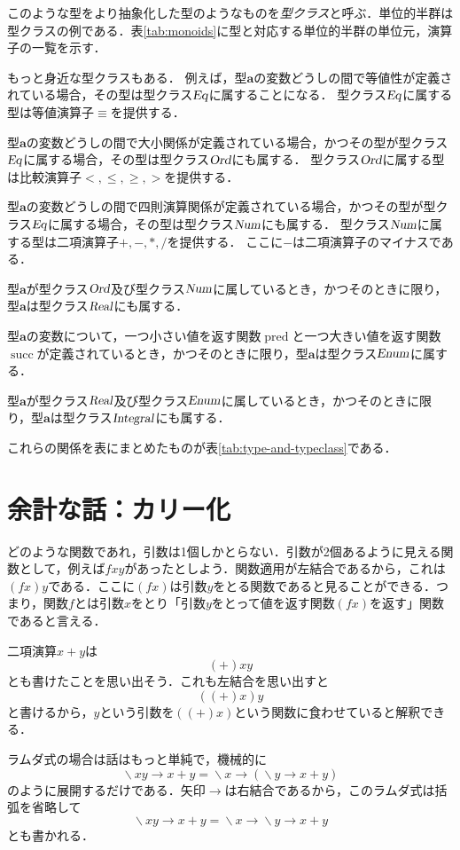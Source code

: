 \documentclass[twocolumn]{jsbook}
\newcommand{\keyword}[1]{{\emph{#1}}}
\newcommand{\hsklType}[1]{\textbf{#1}}
\newcommand{\hsklTypeclass}[1]{\textsl{#1}}
\DeclareMathOperator{\hsklPred}{pred}
\DeclareMathOperator{\hsklSucc}{succ}
\newcommand{\hsklEnum}{\hsklTypeclass{Enum}}
\newcommand{\hsklIntegral}{\hsklTypeclass{Integral}}
\newcommand{\hsklEq}{\hsklTypeclass{Eq}}
\newcommand{\hsklNum}{\hsklTypeclass{Num}}
\newcommand{\hsklOrd}{\hsklTypeclass{Ord}}
\newcommand{\hsklReal}{\hsklTypeclass{Real}}
\DeclareMathOperator{\mathLambda}{\backslash}
\newcommand{\mathLambdaArrow}{\rightarrow}
\newcommand{\mathLambdaExpression}[2]{\mathLambda#1\mathLambdaArrow#2}
\begin{document}
このような型をより抽象化した型のようなものを\keyword{型クラス}と呼ぶ．単位的半群は型クラスの例である．表\ref{tab:monoids}に型と対応する単位的半群の単位元，演算子の一覧を示す．

もっと身近な型クラスもある．
例えば，型$\hsklType{a}$の変数どうしの間で等値性が定義されている場合，その型は型クラス$\hsklEq$に属することになる．
型クラス$\hsklEq$に属する型は等値演算子$\equiv$を提供する．

型$\hsklType{a}$の変数どうしの間で大小関係が定義されている場合，かつその型が型クラス$\hsklEq$に属する場合，その型は型クラス$\hsklOrd$にも属する．
型クラス$\hsklOrd$に属する型は比較演算子$<,\le,\ge,>$を提供する．

型$\hsklType{a}$の変数どうしの間で四則演算関係が定義されている場合，かつその型が型クラス$\hsklEq$に属する場合，その型は型クラス$\hsklNum$にも属する．
型クラス$\hsklNum$に属する型は二項演算子$+,-,*,/$を提供する．
ここに$-$は二項演算子のマイナスである．

型$\hsklType{a}$が型クラス$\hsklOrd$及び型クラス$\hsklNum$に属しているとき，かつそのときに限り，型$\hsklType{a}$は型クラス$\hsklReal$にも属する．

型$\hsklType{a}$の変数について，一つ小さい値を返す関数$\hsklPred$と一つ大きい値を返す関数$\hsklSucc$が定義されているとき，かつそのときに限り，型$\hsklType{a}$は型クラス$\hsklEnum$に属する．

型$\hsklType{a}$が型クラス$\hsklReal$及び型クラス$\hsklEnum$に属しているとき，かつそのときに限り，型$\hsklType{a}$は型クラス$\hsklIntegral$にも属する．

これらの関係を表にまとめたものが表\ref{tab:type-and-typeclass}である．

\section{余計な話：カリー化}

どのような関数であれ，引数は1個しかとらない．引数が2個あるように見える関数として，例えば$fxy$があったとしよう．関数適用が左結合であるから，これは$(fx)y$である．ここに$(fx)$は引数$y$をとる関数であると見ることができる．つまり，関数$f$とは引数$x$をとり「引数$y$をとって値を返す関数$(fx)$を返す」関数であると言える．

二項演算$x+y$は$$(+)xy$$とも書けたことを思い出そう．これも左結合を思い出すと$$((+)x)y$$と書けるから，$y$という引数を$((+)x)$という関数に食わせていると解釈できる．

ラムダ式の場合は話はもっと単純で，機械的に$$\mathLambdaExpression{xy}{x+y}=\mathLambdaExpression{x}{(\mathLambdaExpression{y}{x+y})}$$のように展開するだけである．矢印$\mathLambdaArrow$は右結合であるから，このラムダ式は括弧を省略して$$\mathLambdaExpression{xy}{x+y}=\mathLambdaExpression{x}{\mathLambdaExpression{y}{x+y}}$$とも書かれる．
\end{document}
